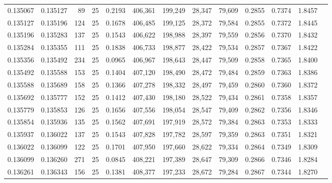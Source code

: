 \begin{tabular}{rrrrrrrrrrrrr}
0.135067 & 0.135127 &    89 &  25 &                                     0.2193 & 406,361 & 199,249 &  28,347 &  79,609 & 0.2855 & 0.7374 & 1.8457 \\
0.135127 & 0.135196 &   124 &  25 &                                     0.1678 & 406,485 & 199,125 &  28,372 &  79,584 & 0.2855 & 0.7372 & 1.8445 \\
0.135196 & 0.135283 &   137 &  25 &                                     0.1543 & 406,622 & 198,988 &  28,397 &  79,559 & 0.2856 & 0.7370 & 1.8432 \\
0.135284 & 0.135355 &   111 &  25 &                                     0.1838 & 406,733 & 198,877 &  28,422 &  79,534 & 0.2857 & 0.7367 & 1.8422 \\
0.135356 & 0.135492 &   234 &  25 &                                     0.0965 & 406,967 & 198,643 &  28,447 &  79,509 & 0.2858 & 0.7365 & 1.8400 \\
0.135492 & 0.135588 &   153 &  25 &                                     0.1404 & 407,120 & 198,490 &  28,472 &  79,484 & 0.2859 & 0.7363 & 1.8386 \\
0.135588 & 0.135689 &   158 &  25 &                                     0.1366 & 407,278 & 198,332 &  28,497 &  79,459 & 0.2860 & 0.7360 & 1.8372 \\
0.135692 & 0.135777 &   152 &  25 &                                     0.1412 & 407,430 & 198,180 &  28,522 &  79,434 & 0.2861 & 0.7358 & 1.8357 \\
0.135779 & 0.135853 &   126 &  25 &                                     0.1656 & 407,556 & 198,054 &  28,547 &  79,409 & 0.2862 & 0.7356 & 1.8346 \\
0.135854 & 0.135936 &   135 &  25 &                                     0.1562 & 407,691 & 197,919 &  28,572 &  79,384 & 0.2863 & 0.7353 & 1.8333 \\
0.135937 & 0.136022 &   137 &  25 &                                     0.1543 & 407,828 & 197,782 &  28,597 &  79,359 & 0.2863 & 0.7351 & 1.8321 \\
0.136022 & 0.136099 &   122 &  25 &                                     0.1701 & 407,950 & 197,660 &  28,622 &  79,334 & 0.2864 & 0.7349 & 1.8309 \\
0.136099 & 0.136260 &   271 &  25 &                                     0.0845 & 408,221 & 197,389 &  28,647 &  79,309 & 0.2866 & 0.7346 & 1.8284 \\
0.136261 & 0.136343 &   156 &  25 &                                     0.1381 & 408,377 & 197,233 &  28,672 &  79,284 & 0.2867 & 0.7344 & 1.8270 \\

\end{tabular}
